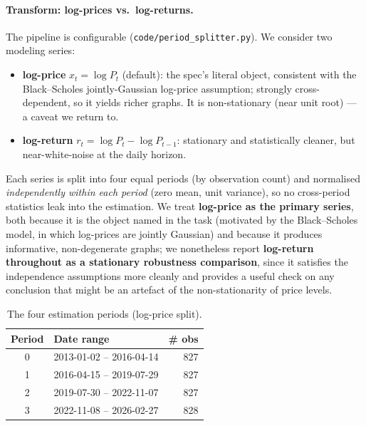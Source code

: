 \documentclass[11pt,a4paper]{article}
\begin{document}
\paragraph{Transform: log-prices vs.\ log-returns.}
The pipeline is configurable (\texttt{code/period\_splitter.py}). We consider two
modeling series:
\begin{itemize}
  \item \textbf{log-price} $x_t=\log P_t$ (default): the spec's literal object,
        consistent with the Black--Scholes jointly-Gaussian log-price
        assumption; strongly cross-dependent, so it yields richer graphs. It is
        non-stationary (near unit root) --- a caveat we return to.
  \item \textbf{log-return} $r_t=\log P_t-\log P_{t-1}$: stationary and
        statistically cleaner, but near-white-noise at the daily horizon.
\end{itemize}
Each series is split into four equal periods (by observation count) and
normalised \emph{independently within each period} (zero mean, unit variance),
so no cross-period statistics leak into the estimation. We treat \textbf{log-price
as the primary series}, both because it is the object named in the task
(motivated by the Black--Scholes model, in which log-prices are jointly Gaussian)
and because it produces informative, non-degenerate graphs; we nonetheless report
\textbf{log-return throughout as a stationary robustness comparison}, since it
satisfies the independence assumptions more cleanly and provides a useful check
on any conclusion that might be an artefact of the non-stationarity of price
levels.

\begin{table}[h]
\centering
\caption{The four estimation periods (log-price split).}
\begin{tabular}{clr}
\toprule
Period & Date range & \# obs \\
\midrule
0 & 2013-01-02 -- 2016-04-14 & 827 \\
1 & 2016-04-15 -- 2019-07-29 & 827 \\
2 & 2019-07-30 -- 2022-11-07 & 827 \\
3 & 2022-11-08 -- 2026-02-27 & 828 \\
\bottomrule
\end{tabular}
\end{table}
\end{document}
